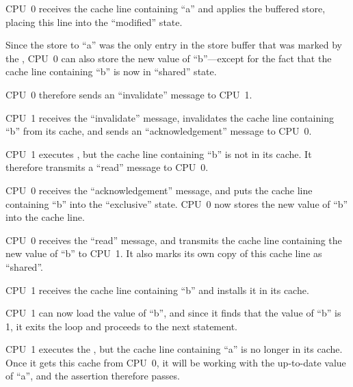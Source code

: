 \begin{sequence}
\item	CPU~0 receives the cache line containing ``a'' and applies
	the buffered store, placing this line into the ``modified''
	state.
\item	Since the store to ``a'' was the only
	entry in the store buffer that was marked by the ,
	CPU~0 can also store the new value of ``b''---except for the
	fact that the cache line containing ``b'' is now in ``shared''
	state.
\item	CPU~0 therefore sends an ``invalidate'' message to CPU~1.
\item	CPU~1 receives the ``invalidate'' message, invalidates the
	cache line containing ``b'' from its cache, and sends an
	``acknowledgement'' message to CPU~0.
\item	CPU~1 executes , but the cache line
	containing ``b'' is not in its cache.
	It therefore transmits a ``read'' message to CPU~0.
\item	CPU~0 receives the ``acknowledgement'' message, and puts
	the cache line containing ``b'' into the ``exclusive'' state.
	CPU~0 now stores the new value of ``b'' into the cache line.
\item	CPU~0 receives the ``read'' message, and transmits the
	cache line containing the new value of ``b''
	to CPU~1.
	It also marks its own copy of this cache line as ``shared''.
	\label{seq:app:whymb:Store buffers: All copies shared}
\item	CPU~1 receives the cache line containing ``b'' and installs
	it in its cache.
\item	CPU~1 can now load the value of ``b'',
	and since it finds that the value of ``b'' is 1, it
	exits the  loop and proceeds
	to the next statement.
\item	CPU~1 executes the , but the cache line containing
	``a'' is no longer in its cache.
	Once it gets this cache from CPU~0, it will be
	working with the up-to-date value of ``a'', and the assertion
	therefore passes.
\end{sequence}

\QuickQuizEnd

